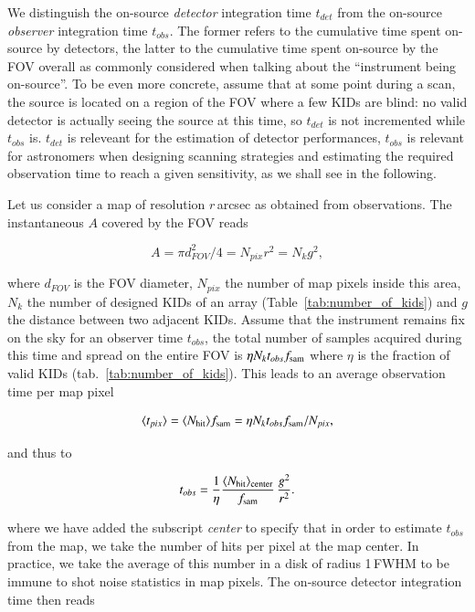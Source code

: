We distinguish the on-source \emph{detector} integration time $t_{det}$ from the
on-source \emph{observer} integration time $t_{obs}$. The former refers to the
cumulative time spent on-source by detectors, the latter to the cumulative time
spent on-source by the FOV overall as commonly considered when talking about the
``instrument being on-source''. To be even more concrete, assume that at some point during
a scan, the source is located on a region of the FOV where a few KIDs are blind: no
valid detector is actually seeing the source at this time, so $t_{det}$ is not
incremented while $t_{obs}$ is. $t_{det}$ is releveant for the estimation of detector
performances, $t_{obs}$ is relevant for astronomers when
designing scanning strategies and estimating the required observation time to
reach a given sensitivity, as we shall see in the following.

Let us consider a map of resolution $r$\,arcsec as obtained from
observations. The instantaneous $A$ covered by the FOV reads

\begin{equation}
A = \pi d_{FOV}^2/4 = N_{pix}r^2 = N_k g^2,
\end{equation}

where $d_{FOV}$ is the FOV diameter, $N_{pix}$ the number of map pixels inside
this area, $N_k$ the number of designed KIDs of an array
(Table~\ref{tab:number_of_kids}) and $g$ the distance between two adjacent
KIDs. Assume that the instrument remains fix on the sky for an observer time
$t_{obs}$, the total number of samples acquired during this time and spread on
the entire FOV is $\eta N_k t_{obs} f_{\rm{sam}}$ where $\eta$ is the fraction
of valid KIDs (tab.~\ref{tab:number_of_kids}). This leads to an average
observation time per map pixel

\begin{equation}
\langle t_{pix}\rangle = \langle N_{\rm{hit}}\rangle f_{\rm{sam}} = \eta N_k
t_{obs} f_{\rm{sam}}/N_{pix},
\end{equation}

and thus to

\begin{equation}
  t_{obs} = \frac{1}{\eta}\frac{\langle N_{\rm{hit}}\rangle_{\rm{center}}}{f_{\rm{sam}}}\,
  \frac{g^2}{r^2}.
\label{eq:t_obs}
\end{equation}

where we have added the subscript \emph{center} to specify that in order to
estimate $t_{obs}$ from the map, we take the number of hits per pixel at the map
center. In practice, we take the average of this number in a disk of radius
1\,FWHM to be immune to shot noise statistics in map pixels. The on-source
detector integration time then reads

